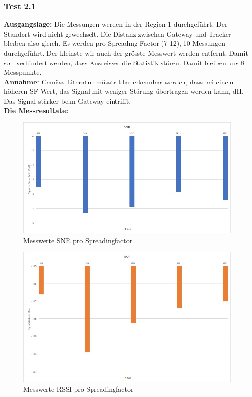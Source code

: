 \documentclass[11pt,english,german]{report}
\theoremstyle{definition}
\begin{document}
\subsubsection{Test 2.1}
\textbf{Ausgangslage:} Die Messungen werden in der Region 1 durchgeführt. Der Standort wird nicht gewechselt. Die Distanz zwischen Gateway und Tracker bleiben also gleich. Es werden pro Spreading Factor (7-12), 10 Messungen durchgeführt. Der kleinste wie auch der grösste Messwert werden entfernt. Damit soll verhindert werden, dass Ausreisser die Statistik stören. Damit bleiben uns 8 Messpunkte. \\[0.3cm]
\textbf{Annahme:} Gemäss Literatur müsste klar erkennbar werden, dass bei einem höheren SF Wert, das Signal mit weniger Störung übertragen werden kann, dH. Das Signal stärker beim Gateway eintrifft.\\[0.3cm]
\textbf{Die Messresultate:}
\begin{figure}[H]
	\centering
		\includegraphics[width=\textwidth]{img/testing/testing1_sf_snr.jpg}
		\caption[Messwerte SNR  pro Spreadingfactor]
		{Messwerte SNR pro Spreadingfactor}
\end{figure}
\begin{figure}[H]
	\centering
	\includegraphics[width=\textwidth]{img/testing/testing1_sf_rssi.jpg}
	\caption[Messwerte RSSI pro Spreadingfactor]
	{Messwerte RSSI pro Spreadingfactor}
\end{figure}
\end{document}
